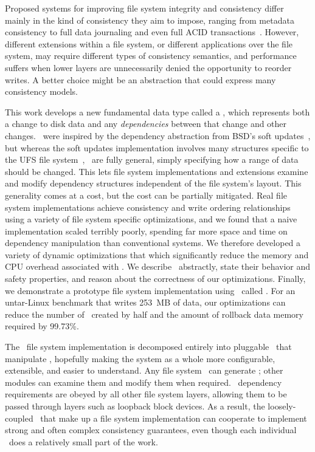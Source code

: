 Proposed systems for improving file system integrity and consistency differ
 mainly in the kind of consistency they aim to impose, ranging from
 metadata consistency to full data journaling
 and even full ACID
 transactions~\cite{gal05transactional,liskov04transactional}.
%
However, different extensions within a file system, or different
 applications over the file system, may require different types of
 consistency semantics, and performance suffers when lower layers are
 unnecessarily denied the opportunity to reorder
 writes.
%
A better choice might be an abstraction that could express many consistency
 models.


This work develops a new fundamental data type called a \emph{\chdesc},
 which represents both a change to disk data and any \emph{dependencies}
 between that change and other changes. 
%
\Chdescs\ were inspired by the dependency abstraction from BSD's soft
 updates~\cite{ganger00soft}, but whereas the soft updates implementation
 involves many structures specific to the UFS file
 system~\cite{mckusick99soft}, \chdescs\ are fully general, simply
 specifying how a range of data should be changed.
%
This lets file system implementations and extensions examine and modify
 dependency structures independent of the file system's layout.
%
This generality comes at a cost, but the cost can be partially mitigated.
%
Real file system implementations achieve consistency and write ordering
 relationships using a variety of file system specific optimizations, and
 we found that a naive implementation scaled terribly poorly, spending far
 more space and time on dependency manipulation than conventional systems.
%
We therefore developed a variety of dynamic optimizations that which
 significantly reduce the memory and CPU overhead associated with \patches.
%
We describe \chdescs\ abstractly, state their behavior and safety
 properties, and reason about the correctness of our optimizations.
%
Finally, we demonstrate a prototype file system implementation using
 \chdescs\ called \Kudos.
%
For an untar-Linux benchmark that writes 253~MB of data, our optimizations
 can reduce the number of \patches\ created by half and the amount of
 rollback data memory required by 99.73\%. 


The \Kudos\ file system implementation is decomposed entirely into
 pluggable \modules\ that manipulate \chdescs, hopefully making the system
 as a whole more configurable, extensible, and easier to understand.
%
Any file system \module\ can generate \chdescs; other modules can examine
 them and modify them when required.
%
\Chdesc\ dependency requirements are obeyed by all other file system
 layers, allowing them to be passed through layers such as loopback block
 devices.
%
As a result, the loosely-coupled \modules\ that make up a file system
 implementation can cooperate to implement strong and often complex
 consistency guarantees, even though each individual \module\ does a
 relatively small part of the work.


